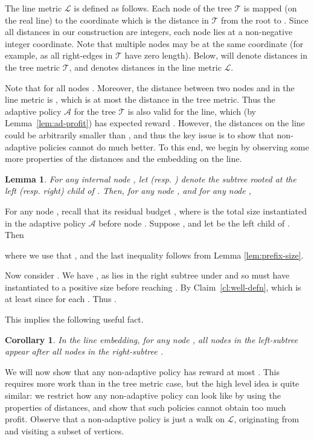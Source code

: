 \documentclass[11pt,letterpaper]{article}
\newtheorem{lemma}[theorem]{Lemma}
\newtheorem{corollary}[theorem]{Corollary}
\numberwithin{algorithm}{section}
\newenvironment{proof}{

\noindent{\bf Proof:}}
{\hfill


}
\newcommand{\A}[0]{{\ensuremath{\mathcal{A}}}\xspace}
\newcommand{\lm}[0]{{\ensuremath{\mathcal{L}}}\xspace}
\newcommand{\T}{\ensuremath{\mathcal{T}}\xspace}
\begin{document}
The line metric \lm is defined as follows. Each node  of the tree \T is mapped (on the real line) to the coordinate  which is the distance in \T from the root  to . Since all distances in our construction are integers, each node lies at a non-negative integer coordinate. Note that multiple nodes may be at the same coordinate (for example, as all right-edges in \T have zero length). Below,  will denote distances in the tree metric \T, and  denotes distances in the line metric \lm.

Note that  for all nodes . Moreover, the distance  between two nodes  and  in the line metric is , which is at most the distance  in the tree metric. Thus the adaptive policy \A for the tree \T is also valid for the line, which (by Lemma~\ref{lem:ad-profit}) has expected reward .
However, the distances  on the line could be arbitrarily smaller than , and thus the key issue is to show that non-adaptive policies cannot do much better. To this end, we begin by observing some more properties of the distances  and the embedding on the line.



\begin{lemma}
\label{lem:dist-lr}
 For any internal node , let  (resp. ) denote the subtree rooted at the left (resp. right) child of .
Then, for any node ,  and
for any node ,

\end{lemma}
\begin{proof}
For any node , recall that its residual budget , where  is the total size instantiated in the adaptive policy \A before node .
Suppose , and let  be the left child of . Then
 
 where we use that ,  and the last inequality follows from Lemma \ref{lem:prefix-size}.

 Now consider .
  We have , as  lies in the right subtree under  and so  must have instantiated to a positive size before reaching .
By Claim~\ref{cl:well-defn},  which is at least  since  for each . Thus .
\end{proof}

This implies the following useful fact.
 \begin{corollary}
 \label{cor:left-right}
 In the line embedding, for any node , all nodes in the left-subtree  appear after all nodes in the right-subtree .
 \end{corollary}

We will now show that any non-adaptive policy has reward at most . This requires more work than in the tree metric case, but the high level idea is quite similar:
we restrict how any non-adaptive policy can look like by using the properties of distances, and show that such policies cannot obtain too much profit.
Observe that a non-adaptive policy  is just a walk on \lm, originating from  and  visiting a subset of vertices.
\end{document}
